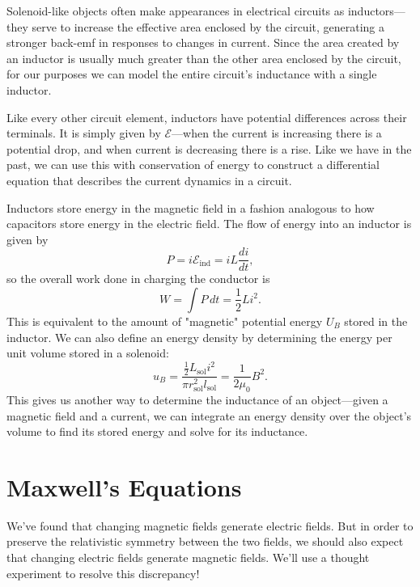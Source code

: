 \documentclass[../p051main.tex]{subfiles}
\begin{document}
Solenoid-like objects often make appearances in electrical circuits as inductors---they serve to increase the effective area enclosed by the circuit, generating a stronger back-emf in responses to changes in current.
Since the area created by an inductor is usually much greater than the other area enclosed by the circuit, for our purposes we can model the entire circuit's inductance with a single inductor.

Like every other circuit element, inductors have potential differences across their terminals.
It is simply given by $\mathcal{E}$---when the current is increasing there is a potential drop, and when current is decreasing there is a rise.
Like we have in the past, we can use this with conservation of energy to construct a differential equation that describes the current dynamics in a circuit.

Inductors store energy in the magnetic field in a fashion analogous to how capacitors store energy in the electric field.
The flow of energy into an inductor is given by
\[ P = i\mathcal{E}_\textrm{ind} = iL \frac{di}{dt}, \]
so the overall work done in charging the conductor is
\[ W = \int P \,dt = \frac{1}{2} Li^2. \]
This is equivalent to the amount of "magnetic" potential energy $U_B$ stored in the inductor.
We can also define an energy density by determining the energy per unit volume stored in a solenoid:
\[ u_B = \frac{\frac{1}{2} L_\textrm{sol} i^2}{\pi r_\textrm{sol}^2 l_\textrm{sol}} = \frac{1}{2\mu_0}B^2. \]
This gives us another way to determine the inductance of an object---given a magnetic field and a current, we can integrate an energy density over the object's volume to find its stored energy and solve for its inductance.

\section{Maxwell's Equations}
We've found that changing magnetic fields generate electric fields.
But in order to preserve the relativistic symmetry between the two fields, we should also expect that changing electric fields generate magnetic fields.
We'll use a thought experiment to resolve this discrepancy!
\end{document}
